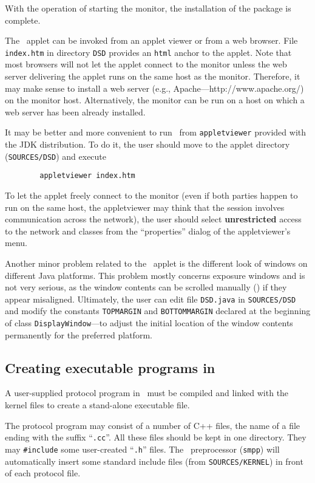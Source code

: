 With the operation of starting the monitor, the installation of the package
is complete.

The \dsd\ applet can be invoked from an applet viewer or from a web browser.
File {\tt index.htm}
in directory {\tt DSD} provides an {\tt html} anchor to the applet.
Note that most browsers will not let the applet connect to the monitor
unless the web server delivering the applet runs on the same host as the
monitor.
Therefore, it may make sense to install a web server
(e.g.,
Apache---{http://www.apache.org/})
on the monitor host.
Alternatively, the monitor can be run on a host on which a web server has been
already installed.

It may be better and more convenient to run \dsd\ from {\tt appletviewer}
provided with the JDK distribution.
To do it, the user should move to the applet directory ({\tt SOURCES/DSD})
and execute
\begin{verbatim}
        appletviewer index.htm
\end{verbatim}

To let the applet freely connect to the monitor (even if both parties
happen to run
on the same host, the appletviewer may think that the session involves
communication across the network), the user should select {\bf unrestricted}
access to the network and classes from the ``properties'' dialog of the
appletviewer's menu.

Another minor problem related to the \dsd\ applet is the different look
of windows on different Java platforms.
This problem mostly concerns exposure windows and is not very serious,
as the window contents can be scrolled manually () if
they appear misaligned.
Ultimately,
the user can edit file {\tt DSD.java} in {\tt SOURCES/DSD} and modify the
constants {\tt TOPMARGIN} and {\tt BOTTOMMARGIN} declared at the
beginning of class {\tt DisplayWindow}---to adjust the initial location
of the window contents permanently for the preferred platform.

\subsection{Creating executable programs in \smurph}
\label{rm_un_cr}

A user-supplied protocol program in \smurph\ must
be compiled and linked with the kernel
files to create a stand-alone executable file.

The protocol program may consist of a number of C++ files, the name of
a file ending with the suffix ``{\tt .cc}''.
All these files should be kept in one directory.
They may {\tt \#include} some user-created ``{\tt .h}'' files.
The \smurph\ preprocessor ({\tt smpp}) will automatically insert some standard
include files (from {\tt SOURCES/KERNEL}) in front of each protocol file.

